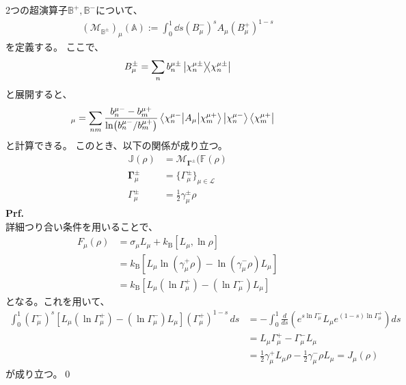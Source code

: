 \documentclass[a4paper,11pt]{jsarticle}
\numberwithin{equation}{section}
\begin{document}
2つの超演算子$\mathbb{B}^{+}, \mathbb{B}^{-} $について、
\begin{align}
    (\mathcal{M}_{\mathbb{B}^{\pm}} )_{\mu} (\mathbb{A}) := \int_{0}^{1} \dd{s} (B_{\mu}^{-})^{s} A_{\mu} (B_{\mu}^{+})^{1-s}
\end{align}
を定義する。
ここで、
\begin{align}
    B_{\mu}^{\pm} = \sum_{n} b_{n}^{\mu\pm} \ketbra{\chi_{n}^{\mu\pm}}
\end{align}
と展開すると、
\begin{align}
[\mathcal{M}_{\mathbb{B}^{\pm}}(\mathbb{A})]_{\mu}
&=
\sum_{n m}
\frac{b_{n}^{\mu -} - b_{m}^{\mu +}}
{\ln (b_{n}^{\mu -} / b_{m}^{\mu +})}
\mel{\chi_{n}^{\mu -}}{A_{\mu}}{\chi_{m}^{\mu +}}
\ket{\chi_{n}^{\mu -}}\bra{\chi_{m}^{\mu +}}
\end{align}
と計算できる。
このとき、以下の関係が成り立つ。
\begin{align}
    \mathbb{J}(\rho) &= \mathcal{M}_{\mathbf{\Gamma}^{\pm}}(\mathbb{F}(\rho)\\
    \mathbf{\Gamma}_{\mu}^{\pm} &=\{\Gamma_{\mu}^{\pm}\}_{\mu \in \mathcal{L}} \\
    \Gamma_{\mu}^{\pm} &= \frac{1}{2}\gamma_{\mu}^{\pm} \rho
\end{align}
\textbf{Prf.}\\
詳細つり合い条件を用いることで、
\begin{align}
F_{\mu}(\rho)
&= \sigma_{\mu} L_{\mu} + k_{\mathrm{B}} [L_{\mu}, \ln \rho] \\
&= k_{\mathrm{B}} \left[ L_{\mu} \ln(\gamma_{\mu}^{+} \rho) - \ln(\gamma_{\mu}^{-} \rho) L_{\mu} \right] \\
&= k_{\mathrm{B}} \left[ L_{\mu} (\ln \Gamma_{\mu}^{+}) - (\ln \Gamma_{\mu}^{-}) L_{\mu} \right]
\end{align}
となる。これを用いて、
\begin{align}
\int_{0}^{1} (\Gamma_{\mu}^{-})^{s}
\left[ L_{\mu} (\ln \Gamma_{\mu}^{+}) - (\ln \Gamma_{\mu}^{-}) L_{\mu} \right]
(\Gamma_{\mu}^{+})^{1-s} \, ds
&= -\int_{0}^{1} \frac{d}{ds}
\left( e^{s \ln \Gamma_{\mu}^{-}} L_{\mu} e^{(1-s) \ln \Gamma_{\mu}^{+}} \right) ds \\
&= L_{\mu} \Gamma_{\mu}^{+} - \Gamma_{\mu}^{-} L_{\mu} \\
&= \frac{1}{2}\gamma_{\mu}^{+} L_{\mu} \rho - \frac{1}{2}\gamma_{\mu}^{-} \rho L_{\mu}
= J_{\mu}(\rho)
\end{align}
が成り立つ。\qed\\
\end{document}
